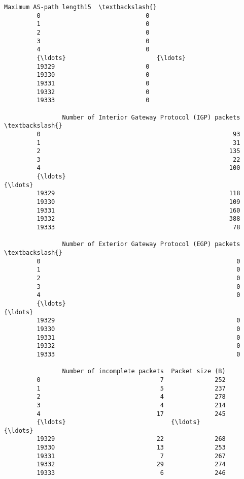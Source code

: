 \documentclass[11pt]{article}
\begin{document}
\begin{Verbatim}[commandchars=\\\{\}]
                Maximum AS-path length15  \textbackslash{}
         0                             0   
         1                             0   
         2                             0   
         3                             0   
         4                             0   
         {\ldots}                         {\ldots}   
         19329                         0   
         19330                         0   
         19331                         0   
         19332                         0   
         19333                         0   
         
                Number of Interior Gateway Protocol (IGP) packets  \textbackslash{}
         0                                                     93   
         1                                                     31   
         2                                                    135   
         3                                                     22   
         4                                                    100   
         {\ldots}                                                  {\ldots}   
         19329                                                118   
         19330                                                109   
         19331                                                160   
         19332                                                388   
         19333                                                 78   
         
                Number of Exterior Gateway Protocol (EGP) packets  \textbackslash{}
         0                                                      0   
         1                                                      0   
         2                                                      0   
         3                                                      0   
         4                                                      0   
         {\ldots}                                                  {\ldots}   
         19329                                                  0   
         19330                                                  0   
         19331                                                  0   
         19332                                                  0   
         19333                                                  0   
         
                Number of incomplete packets  Packet size (B)  
         0                                 7              252  
         1                                 5              237  
         2                                 4              278  
         3                                 4              214  
         4                                17              245  
         {\ldots}                             {\ldots}              {\ldots}  
         19329                            22              268  
         19330                            13              253  
         19331                             7              267  
         19332                            29              274  
         19333                             6              246  
         

\end{Verbatim}
\end{document}
